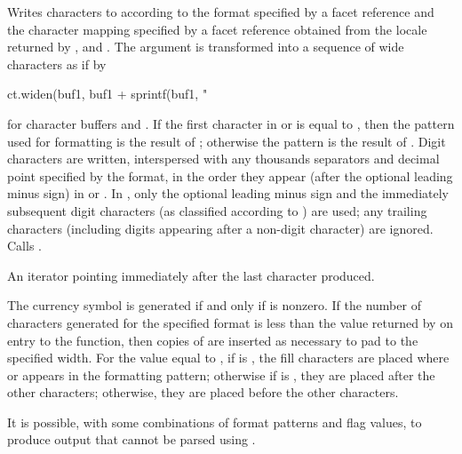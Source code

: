 \begin{itemdescr}
\pnum
\effects
Writes characters to
according to the format specified by a
facet reference
and the character mapping specified by a
facet reference
obtained from the locale returned by
,
and
.
The argument
is transformed into a sequence of wide characters as if by
\begin{codeblock}
ct.widen(buf1, buf1 + sprintf(buf1, "%
\end{codeblock}
for character buffers
and
.
If the first character in
or
is equal to
,
then the pattern used for formatting is the result of
;
otherwise the pattern is the result of
.
Digit characters are written, interspersed with any thousands separators
and decimal point specified by the format, in the order they appear
(after the optional leading minus sign)
in
or
.
In
,
only the optional leading minus sign and the immediately subsequent
digit characters (as classified according to
)
are used; any trailing characters (including digits appearing
after a non-digit character) are ignored.
Calls
.

\pnum
\returns
An iterator pointing immediately after the last character produced.

\pnum
\remarks
The currency symbol is generated if and only if
is nonzero.
If the number of characters generated for the specified format is less than the value
returned by
on entry to the function, then copies of
are inserted as necessary to pad to the specified width.
For the value
equal to
,
if
is , the fill characters are placed where
or
appears in the formatting pattern; otherwise if
is , they are placed after the other characters;
otherwise, they are placed before the other characters.
\begin{note}
It is possible, with some combinations of format patterns and flag values,
to produce output that cannot be parsed using
.
\end{note}
\end{itemdescr}

